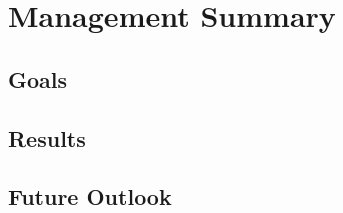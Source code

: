 \chapter*{Management Summary}
\lipsum[2-4]
\newpage
\section*{Goals}
\lipsum[5-6]
\section*{Results}
\lipsum[8-10]
\section*{Future Outlook}
\lipsum[10-11]